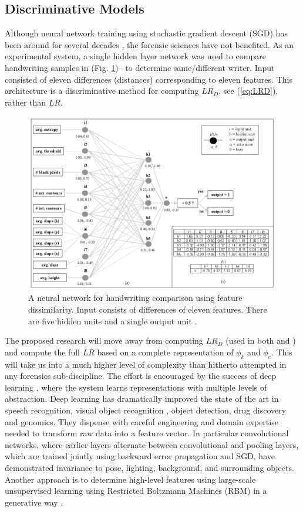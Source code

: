 \documentclass[11pt, doublespacing]{article}
\begin{document}
\subsection{Discriminative Models}
Although neural network training  using stochastic gradient descent (SGD)  has been around for several decades \cite{Bishop2006},  the forensic sciences have not benefited.  
As an experimental system, a single hidden layer network was used to compare handwriting samples in \cite{Srihari2002} (Fig. \ref{fig:NN-JFS})-- to determine same/different writer. Input consisted of eleven differences (distances) corresponding to eleven features.  This architecture is a  discriminative method for computing  $LR_D$, see (\ref{eq:LRD}), rather than $LR$. 
\begin{figure}
\centering
\includegraphics[width=0.5\linewidth]{Figures/NeuralNetworkJFS}
\caption{\small{A neural network for  handwriting comparison using feature dissimilarity. Input consists of differences of eleven features. There are five hidden units and  a single output unit \cite{Srihari2002}.}}
\label{fig:NN-JFS}
\end{figure}

The proposed research will move away from computing $LR_{D}$ (used in both \cite{Srihari2002} and  \cite{Srihari2007}) and compute the full $LR$ based on a complete representation of $\phi_{k} $ and $\phi_{e}$. This will take us into a much higher level of complexity than hitherto attempted in any forensics sub-discipline.
The effort   is encouraged by the success of deep learning \cite{LeCun2015}, where the system learns representations with multiple levels of abstraction. Deep learning has dramatically improved the state of the art in speech recognition, visual object recognition \cite{Krizhevsky2012}, object detection, drug discovery and genomics. They dispense with careful engineering and domain expertise needed to transform raw data into a feature vector.  In particular convolutional networks, where earlier layers alternate between convolutional and pooling layers,  which are trained jointly using  backward error propagation and SGD, have demonstrated invariance to pose, lighting, background, and surrounding objects. Another approach is to determine high-level features using large-scale unsupervised learning using Restricted Boltzmann Machines (RBM) in a generative way \cite{Le2012}.
\end{document}
